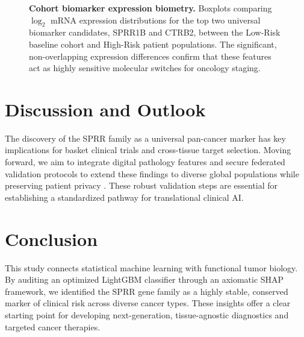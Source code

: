 \documentclass[11pt]{article}
\begin{document}
\begin{figure}[htbp]
\begin{minipage}{0.48\textwidth}
\end{minipage}
\caption{\textbf{Cohort biomarker expression biometry.} Boxplots comparing $\log_2$ mRNA expression distributions for the top two universal biomarker candidates, SPRR1B and CTRB2, between the Low-Risk baseline cohort and High-Risk patient populations. The significant, non-overlapping expression differences confirm that these features act as highly sensitive molecular switches for oncology staging.}
\label{fig:mocip_boxplot_biometry}
\end{figure}


\section{Discussion and Outlook}

The discovery of the SPRR family as a universal pan-cancer marker has key implications for basket clinical trials and cross-tissue target selection. Moving forward, we aim to integrate digital pathology features and secure federated validation protocols to extend these findings to diverse global populations while preserving patient privacy \citep{ghosh2025privacy}. These robust validation steps are essential for establishing a standardized pathway for translational clinical AI.


\section{Conclusion}

This study connects statistical machine learning with functional tumor biology. By auditing an optimized LightGBM classifier through an axiomatic SHAP framework, we identified the SPRR gene family as a highly stable, conserved marker of clinical risk across diverse cancer types. These insights offer a clear starting point for developing next-generation, tissue-agnostic diagnostics and targeted cancer therapies.



\end{document}

